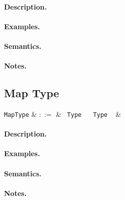 \paragraph{Description.}

\paragraph{Examples.}

\paragraph{Semantics.}

\paragraph{Notes.} 


\subsection{Map Type}

\begin{syntax}
  \verb+MapType+ & $::=$ & \token{\{} \ \verb+Type+ \ \token{=>} \ \verb+Type+ \ \token{\}} &\\
\end{syntax}

\paragraph{Description.}

\paragraph{Examples.}

\paragraph{Semantics.}

\paragraph{Notes.} 


